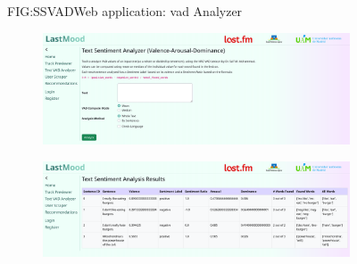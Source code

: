 \begin{figure}[Web application: VAD Analyzer]{FIG:SSVAD}{Web application: \acs{vad} Analyzer}
    \begin{subfigure}[SBFIG:SSVADForm]{\acs{vad} analyzer form}{\includegraphics[width=1\textwidth]{img/SSVADForm.png}}
    \end{subfigure}
    \begin{subfigure}[SBFIG:SSVAD]{Example analysis by sentences}{\includegraphics[width=1\textwidth]{img/SSVAD.png}}
    \end{subfigure}
\end{figure}

